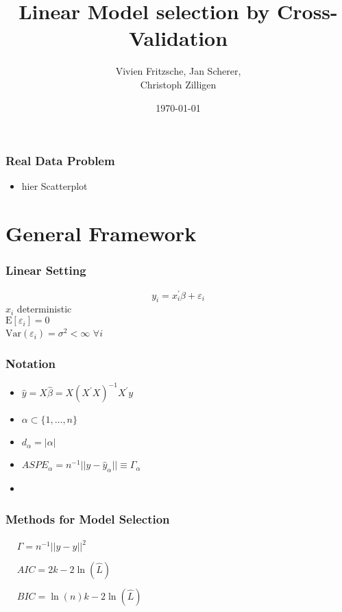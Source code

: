 \documentclass[20pt,mathserif]{beamer}
\title[Cross Validation]{ Linear Model selection by Cross-Validation}
\author{ Vivien Fritzsche, Jan Scherer, \\ Christoph Zilligen}
\date{\today}
\newcommand{\E}{\mathrm{E}}
\newcommand{\Var}{\mathrm{Var}}
\begin{document}
\beamertemplatenavigationsymbolsempty
\begin{frame}
\titlepage
\thispagestyle{empty}
\end{frame}

\begin{frame}
\frametitle{Real Data Problem}
\begin{itemize}
	\item hier Scatterplot
\end{itemize}
\end{frame}

\thispagestyle{empty}
\section{General Framework}

\begin{frame}
\frametitle{Linear Setting}
\[
	y_i=x_i^\prime\beta+\varepsilon_i
\]
$x_i$ deterministic\\\vspace*{5pt}
$\E[\varepsilon_i]=0$\\\vspace*{5pt}
$\Var(\varepsilon_i)=\sigma^2<\infty$ $\forall i$
\end{frame}

\begin{frame}
\frametitle{Notation}
\begin{itemize}
	\item $\hat{y}=X\hat{\beta}=X(X^\prime X)^{-1} X^\prime y$
	\item $\alpha \subset \{1,\ldots,n\}$
	\item $d_\alpha=|\alpha|$
	\item $ASPE_\alpha = n^{-1} ||y-\hat{y}_\alpha||\equiv\Gamma_\alpha$
	\item 
\end{itemize}
\end{frame}


\begin{frame}
\frametitle{Methods for Model Selection}

\begin{align*}
&\Gamma=n^{-1}||y-\hat{y}||^2
\\\\
&AIC = 2k - 2\ln(\hat{L})\hspace{30cm}
\\\\
&BIC = \ln(n)k - 2\ln(\hat{L})
\end{align*}
\end{frame}
\end{document}

